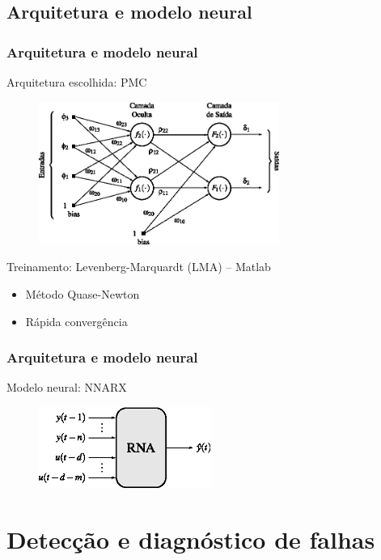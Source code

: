 \documentclass{beamer}
\begin{document}
\subsection{Arquitetura e modelo neural}
\begin{frame}
    \frametitle{Arquitetura e modelo neural}

    Arquitetura escolhida: PMC

\begin{figure}[htb]
\centering
    \includegraphics[width=0.7\textwidth]{imgs/rnas/eps/pmc}
\end{figure}

    Treinamento: Levenberg-Marquardt (LMA) -- Matlab\reg

\begin{itemize}
    \item Método Quase-Newton
    \item Rápida convergência
\end{itemize}

\end{frame}

\begin{frame}
    \frametitle{Arquitetura e modelo neural}

    Modelo neural: NNARX
\begin{figure}[htb]
\centering
    \includegraphics[width=0.5\textwidth]{imgs/rnas/eps/nnarx}
\end{figure}
\end{frame}

\section{Detecção e diagnóstico de falhas}
\end{document}
